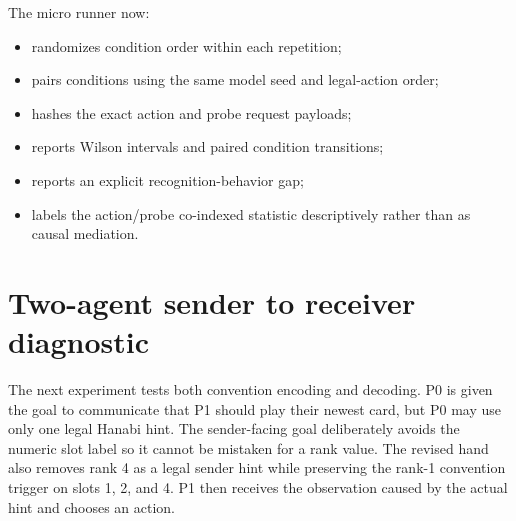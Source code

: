 \documentclass[11pt,a4paper]{article}
\begin{document}
The micro runner now:
\begin{itemize}
\item randomizes condition order within each repetition;
\item pairs conditions using the same model seed and legal-action order;
\item hashes the exact action and probe request payloads;
\item reports Wilson intervals and paired condition transitions;
\item reports an explicit recognition-behavior gap;
\item labels the action/probe co-indexed statistic descriptively rather than as causal mediation.
\end{itemize}

\section{Two-agent sender to receiver diagnostic}

The next experiment tests both convention encoding and decoding. P0 is given the goal to communicate that P1 should play their newest card, but P0 may use only one legal Hanabi hint. The sender-facing goal deliberately avoids the numeric slot label so it cannot be mistaken for a rank value. The revised hand also removes rank 4 as a legal sender hint while preserving the rank-1 convention trigger on slots 1, 2, and 4. P1 then receives the observation caused by the actual hint and chooses an action.

\begin{figure}[H]
\centering
{}
\end{figure}
\end{document}

